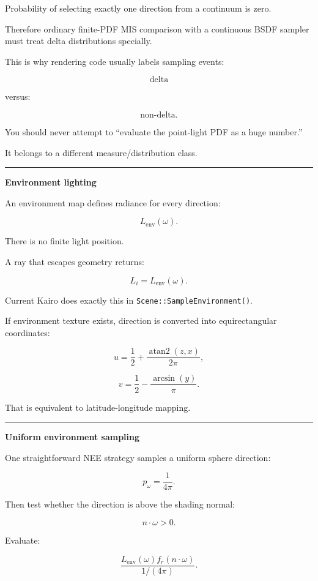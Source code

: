 Probability of selecting exactly one direction from a continuum is zero.

Therefore ordinary finite-PDF MIS comparison with a continuous BSDF sampler must treat delta distributions specially.

This is why rendering code usually labels sampling events:

\[
\text{delta}
\]

versus:

\[
\text{non-delta}.
\]

You should never attempt to ``evaluate the point-light PDF as a huge number.''

It belongs to a different measure/distribution class.

\begin{center}\rule{0.5\linewidth}{0.5pt}\end{center}

\textbf{Environment lighting}

An environment map defines radiance for every direction:

\[
L_{\text{env}}(\omega).
\]

There is no finite light position.

A ray that escapes geometry returns:

\[
\boxed{
L_i=
L_{\text{env}}(\omega).
}
\]

Current Kairo does exactly this in \texttt{Scene::SampleEnvironment()}.

If environment texture exists, direction is converted into equirectangular coordinates:

\[
u=
\frac12+
\frac{
\operatorname{atan2}(z,x)
}{
2\pi
},
\]

\[
v=
\frac12-
\frac{
\arcsin(y)
}{
\pi
}.
\]

That is equivalent to latitude-longitude mapping.

\begin{center}\rule{0.5\linewidth}{0.5pt}\end{center}

\textbf{Uniform environment sampling}

One straightforward NEE strategy samples a uniform sphere direction:

\[
p_\omega
=
\frac1{4\pi}.
\]

Then test whether the direction is above the shading normal:

\[
n\cdot\omega>0.
\]

Evaluate:

\[
\frac{
L_{\text{env}}(\omega)
f_r
(n\cdot\omega)
}{
1/(4\pi)
}.
\]

